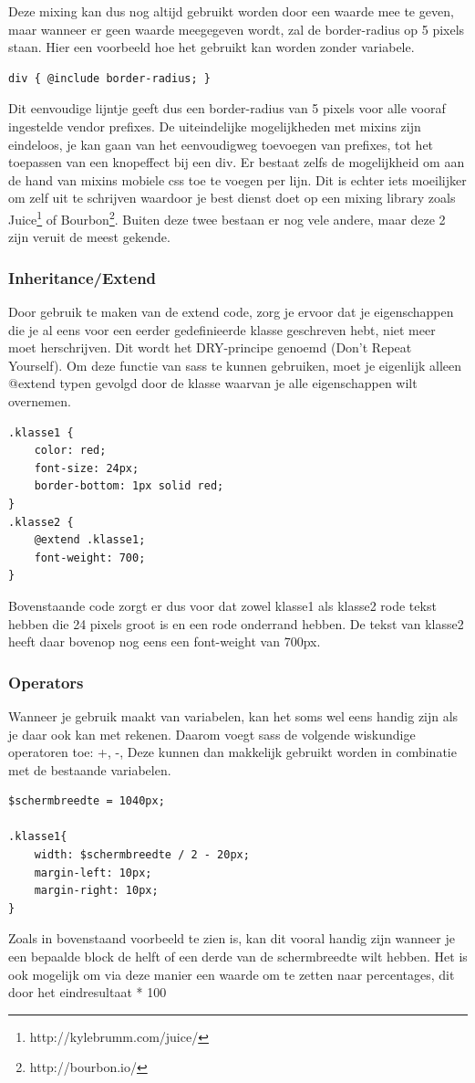 \documentclass[pdftex,a4paper,12pt,twoside]{report}
\begin{document}
Deze mixing kan dus nog altijd gebruikt worden door een waarde mee te geven, maar wanneer er geen waarde meegegeven wordt, zal de border-radius op 5 pixels staan. Hier een voorbeeld hoe het gebruikt kan worden zonder variabele.
\begin{lstlisting}
div { @include border-radius; }
\end{lstlisting}
Dit eenvoudige lijntje geeft dus een border-radius van 5 pixels voor alle vooraf ingestelde vendor prefixes. De uiteindelijke mogelijkheden met mixins zijn eindeloos, je kan gaan van het eenvoudigweg toevoegen van prefixes, tot het toepassen van een knopeffect bij een div. Er bestaat zelfs de mogelijkheid om aan de hand van mixins mobiele css toe te voegen per lijn. Dit is echter iets moeilijker om zelf uit te schrijven waardoor je best dienst doet op een mixing library zoals Juice\footnote{http://kylebrumm.com/juice/} of Bourbon\footnote{http://bourbon.io/}. Buiten deze twee bestaan er nog vele andere, maar deze 2 zijn veruit de meest gekende.
\subsubsection{Inheritance/Extend}
Door gebruik te maken van de extend code, zorg je ervoor dat je eigenschappen die je al eens voor een eerder gedefinieerde klasse geschreven hebt, niet meer moet herschrijven. Dit wordt het DRY-principe genoemd (Don't Repeat Yourself).\newline
Om deze functie van sass te kunnen gebruiken, moet je eigenlijk alleen @extend typen gevolgd door de klasse waarvan je alle eigenschappen wilt overnemen.
\begin{lstlisting}
.klasse1 {
	color: red;
	font-size: 24px;
	border-bottom: 1px solid red;
}
.klasse2 {
	@extend .klasse1;
	font-weight: 700;
}
\end{lstlisting}
Bovenstaande code zorgt er dus voor dat zowel klasse1 als klasse2 rode tekst hebben die 24 pixels groot is en een rode onderrand hebben. De tekst van klasse2 heeft daar bovenop nog eens een font-weight van 700px.
\subsubsection{Operators}
Wanneer je gebruik maakt van variabelen, kan het soms wel eens handig zijn als je daar ook kan met rekenen. Daarom voegt sass de volgende wiskundige operatoren toe: +, -, %
Deze kunnen dan makkelijk gebruikt worden in combinatie met de bestaande variabelen.
\begin{lstlisting}
$schermbreedte = 1040px;

.klasse1{
	width: $schermbreedte / 2 - 20px;
	margin-left: 10px;
	margin-right: 10px;
}
\end{lstlisting}
Zoals in bovenstaand voorbeeld te zien is, kan dit vooral handig zijn wanneer je een bepaalde block de helft of een derde van de schermbreedte wilt hebben. Het is ook mogelijk om via deze manier een waarde om te zetten naar percentages, dit door het eindresultaat * 100%
\end{document}
